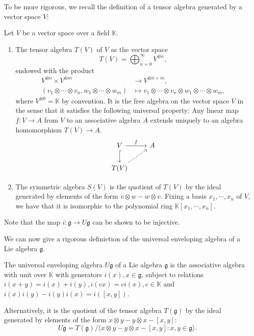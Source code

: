 \documentclass{report}
\begin{document}
To be more rigorous, we recall the definition of a tensor algebra generated by a vector space $V$:
\begin{definition}
    Let $V$ be a vector space over a field $\mathbb K$.
    \begin{enumerate}[label = (\roman*)]
        \item 
        The tensor algebra $T(V)$ of $V$ as the vector space
    \[
    T(V) = \bigoplus_{n=0}^\infty V^{\otimes n},
    \]
    endowed with the product
    \begin{align*}
        V^{\otimes n} \times V^{\otimes m} &\to V^{\otimes n+m},\\
        (v_1 \otimes \cdots \otimes v_n, w_1 \otimes \cdots \otimes w_m) &\mapsto v_1 \otimes \cdots \otimes v_n \otimes w_1 \otimes \cdots \otimes w_m,
    \end{align*}
    where $V^{\otimes 0} = \mathbb K$ by convention.
    It is the free algebra on the vector space $V$ in the sense that it satisfies the following universal property:
    Any linear map $f: V \to A$ from $V$ to an associative algebra $A$ extends uniquely to an algebra homomorphism $T(V) \to A$.
    \[
    \begin{tikzcd}
        V \arrow[r, "f"] \arrow[d, hook] & A\\
        T(V) \arrow[ur, dashed]
    \end{tikzcd}
    \]
    \item
    The symmetric algebra $S(V)$ is the quotient of $T(V)$ by the ideal generated by elements of the form $v \otimes w - w \otimes v$.
    Fixing a basis $x_1, \cdots, x_n$ of $V$, we have that it is isomorphic to the polynomial ring $\mathbb K[x_1, \cdots, x_n]$.
    \end{enumerate}
\end{definition}
Note that the map $i: \mathfrak g \to U \mathfrak g$ can be shown to be injective.

We can now give a rigorous definiction of the universal enveloping algebra of a Lie algebra $\mathfrak g$.
\begin{definition}
    The universal enveloping algebra $U \mathfrak g$ of a Lie algebra $\mathfrak g$ is the associative algebra with unit over $\mathbb K$ with generators $i(x), x \in \mathfrak g$, subject to relations $i(x+y) = i(x)+i(y), i(c x) = ci(x), c \in \mathbb K $ and  $i(x) i(y) - i(y) i(x) = i([x,y])$.

    Alternatively, it is the quotient of the tensor algebra $T(\mathfrak g)$ by the ideal generated by elements of the form $x \otimes y - y \otimes x - [x,y]$:
    \[
    U \mathfrak g = T(\mathfrak g) / \langle x \otimes y - y \otimes x - [x,y] : x, y \in \mathfrak g \rangle.
    \]
\end{definition}
\end{document}
